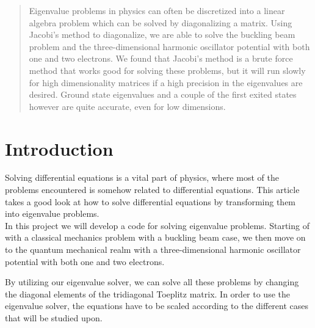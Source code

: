\documentclass[twoside,onecolumn]{article}
\begin{document}
\tableofcontents
\newpage
\begin{abstract}
Eigenvalue problems in physics can often be discretized into a linear algebra problem which can be solved by diagonalizing a matrix. Using Jacobi's method to diagonalize, we are able to solve the buckling beam problem and the three-dimensional harmonic oscillator potential with both one and two electrons. We found that Jacobi's method is a brute force method that works good for solving these problems, but it will run slowly for high dimensionality matrices if a high precision in the eigenvalues are desired. Ground state eigenvalues and a couple of the first exited states however are quite accurate, even for low dimensions. 
\end{abstract}


\section{Introduction}
Solving differential equations is a vital part of physics, where most of the problems encountered is somehow related to differential equations. This article takes a good look at how to solve differential equations by transforming them into eigenvalue problems. \\

In this project we will develop a code for solving eigenvalue problems. Starting of with a classical mechanics problem with a buckling beam case, we then move on to the quantum mechanical realm with a three-dimensional harmonic oscillator potential with both one and two electrons.

\bigskip

By utilizing our eigenvalue solver, we can solve all these problems by changing the diagonal elements of the tridiagonal Toeplitz matrix. In order to use the eigenvalue solver, the equations have to be scaled according to the different cases that will be studied upon.
\end{document}
